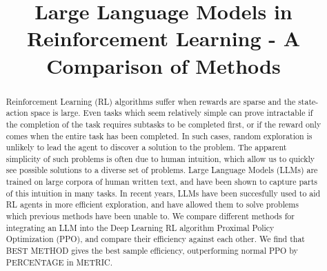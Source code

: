 \documentclass[conference]{IEEEtran}
\begin{document}
\title{Large Language Models in Reinforcement Learning - A Comparison of Methods}
\thispagestyle{plain}
\pagestyle{plain}

\author{
\and
{}
\and
{}
}

\maketitle

\begin{abstract}

Reinforcement Learning (RL) algorithms suffer when rewards are sparse and the state-action space is large. Even tasks which seem relatively simple can prove intractable if the completion of the task requires subtasks to be completed first, or if the reward only comes when the entire task has been completed. In such cases, random exploration is unlikely to lead the agent to discover a solution to the problem. The apparent simplicity of such problems is often due to human intuition, which allow us to quickly see possible solutions to a diverse set of problems. Large Language Models (LLMs) are trained on large corpora of human written text, and have been shown to capture parts of this intuition in many tasks. In recent years, LLMs have been succesfully used to aid RL agents in more efficient exploration, and have allowed them to solve problems which previous methods have been unable to. We compare different methods for integrating an LLM into the Deep Learning RL algorithm Proximal Policy Optimization (PPO), and compare their efficiency against each other. We find that BEST METHOD gives the best sample efficiency, outperforming normal PPO by PERCENTAGE in METRIC.

\end{abstract}
\end{document}
